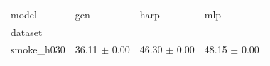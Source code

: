 \begin{tabular}{llll}
\toprule
model & gcn & harp & mlp \\
dataset &  &  &  \\
\midrule
smoke_h030 & 36.11 $\pm$ 0.00 & 46.30 $\pm$ 0.00 & 48.15 $\pm$ 0.00 \\
\bottomrule
\end{tabular}
